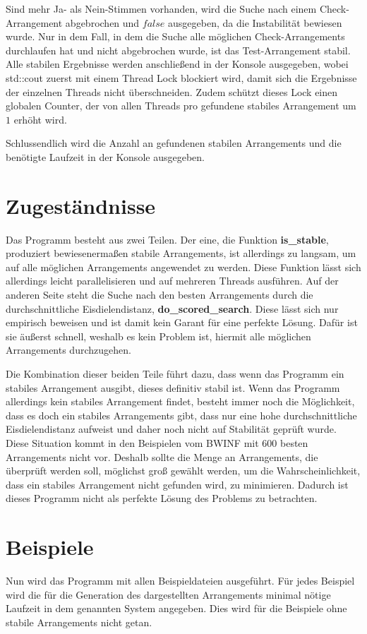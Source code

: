 \documentclass[a4paper,10pt,ngerman,captions=figureheading]{scrartcl}
\begin{document}
\medskip
Sind mehr Ja- als Nein-Stimmen vorhanden, wird die Suche nach einem Check-Arrangement abgebrochen und $false$ ausgegeben, da die Instabilität bewiesen wurde.
Nur in dem Fall, in dem die Suche alle möglichen Check-Arrangements durchlaufen hat und nicht abgebrochen wurde, ist das Test-Arrangement stabil.
Alle stabilen Ergebnisse werden anschließend in der Konsole ausgegeben, wobei std::cout zuerst mit einem Thread Lock blockiert wird, damit sich die Ergebnisse der einzelnen Threads nicht überschneiden.
Zudem schützt dieses Lock einen globalen Counter, der von allen Threads pro gefundene stabiles Arrangement um $1$ erhöht wird.

\medskip
Schlussendlich wird die Anzahl an gefundenen stabilen Arrangements und die benötigte Laufzeit in der Konsole ausgegeben.

\section{Zugeständnisse}
Das Programm besteht aus zwei Teilen.
Der eine, die Funktion \textbf{is\_stable}, produziert bewiesenermaßen stabile Arrangements, ist allerdings zu langsam, um auf alle möglichen Arrangements angewendet zu werden.
Diese Funktion lässt sich allerdings leicht parallelisieren und auf mehreren Threads ausführen.
Auf der anderen Seite steht die Suche nach den besten Arrangements durch die durchschnittliche Eisdielendistanz, \textbf{do\_scored\_search}.
Diese lässt sich nur empirisch beweisen und ist damit kein Garant für eine perfekte Lösung.
Dafür ist sie äußerst schnell, weshalb es kein Problem ist, hiermit alle möglichen Arrangements durchzugehen.

Die Kombination dieser beiden Teile führt dazu, dass wenn das Programm ein stabiles Arrangement ausgibt, dieses definitiv stabil ist.
Wenn das Programm allerdings kein stabiles Arrangement findet, besteht immer noch die Möglichkeit, dass es doch ein stabiles Arrangements gibt, dass nur eine hohe durchschnittliche Eisdielendistanz aufweist und daher noch nicht auf Stabilität geprüft wurde.
Diese Situation kommt in den Beispielen vom BWINF mit $600$ besten Arrangements nicht vor.
Deshalb sollte die Menge an Arrangements, die überprüft werden soll, möglichst groß gewählt werden, um die Wahrscheinlichkeit, dass ein stabiles Arrangement nicht gefunden wird, zu minimieren.
Dadurch ist dieses Programm nicht als perfekte Lösung des Problems zu betrachten.

\section{Beispiele}
Nun wird das Programm mit allen Beispieldateien ausgeführt.
Für jedes Beispiel wird die für die Generation des dargestellten Arrangements minimal nötige Laufzeit in dem genannten System angegeben.
Dies wird für die Beispiele ohne stabile Arrangements nicht getan.
\end{document}
